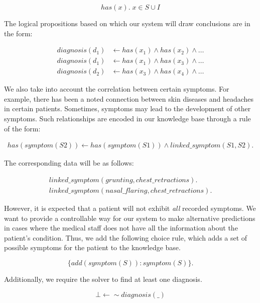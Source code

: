 \documentclass[10pt,leqno]{amsart}
\begin{document}
\begin{equation}
    has(x). \; x \in S \cup I
\end{equation}

The logical propositions based on which our system will draw conclusions are in the form:

\begin{align}
    diagnosis(d_1) & \longleftarrow has(x_1) \land has(x_2) \land \dots \\
    diagnosis(d_1) & \longleftarrow has(x_1) \land has(x_3) \land \dots \\
    diagnosis(d_2) & \longleftarrow has(x_3) \land has(x_4) \land \dots
\end{align}

We also take into account the correlation between certain symptoms. For example, there has been a noted connection between skin diseases and headaches in certain patients\cite{migraine-hives}. Sometimes, symptoms may lead to the development of other symptoms. Such relationships are encoded in our knowledge base through a rule of the form:

\begin{align}
    has(symptom(S2)) \longleftarrow has(symptom(S1)) \land linked\_symptom(S1, S2).
\end{align}

The corresponding data will be as follows:

\begin{align}
    linked\_symptom(grunting, chest\_retractions).\\
    linked\_symptom(nasal\_flaring, chest\_retractions).
\end{align}

However, it is expected that a patient will not exhibit \textit{all} recorded symptoms. We want to provide a controllable way for our system to make alternative predictions in cases where the medical staff does not have all the information about the patient's condition. Thus, we add the following choice rule, which adds a set of possible symptoms for the patient to the knowledge base.

\begin{equation}
    \{ add(symptom(S)) : symptom(S) \}.
\end{equation}

Additionally, we require the solver to find at least one diagnosis.

\begin{equation}
    \bot \longleftarrow \sim diagnosis(\_)
\end{equation}
\end{document}
